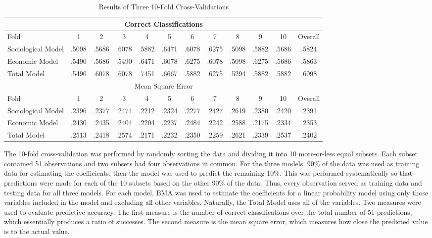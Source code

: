 \begin{table}
\begin{center}
\caption{Results of Three 10-Fold Cross-Validations}
\vspace{0.1cm}
\begin{tabular}{lccccccccccc}
  \hline
  \multicolumn{12}{c}{Correct Classifications} \\ \hline
 Fold & 1 & 2 & 3 & 4 & 5 & 6 & 7 & 8 & 9 & 10 & Overall \\ \hline
 Sociological Model & .5098 & .5686 & .6078 & .5882 & .6471 & .6078 & .6275 & .5098 & .5882 & .5686 & .5824 \\
 Economic Model & .5490 & .5686 & .5490 & .6471 & .6078 & .6275 & .6078 & .5098 & .6275 & .5686 & .5863 \\
 Total Model & .5490 & .6078 & .6078 & .7451 & .6667 & .5882 & .6275 & .5294 & .5882 & .5882 & .6098 \\ \hline
 \multicolumn{12}{c}{Mean Square Error} \\ \hline
 Fold & 1 & 2 & 3 & 4 & 5 & 6 & 7 & 8 & 9 & 10 & Overall \\ \hline
 Sociological Model & .2396 & .2377 & .2474 & .2212 & .2324 & .2277 & .2427 & .2619 & .2380 & .2420 & .2391 \\
 Economic Model & .2430 & .2435 & .2404 & .2204 & .2237 & .2484 & .2242 & .2588 & .2175 & .2334 & .2353 \\
 Total Model & .2513 & .2418 & .2574 & .2171 & .2232 & .2350 & .2259 & .2621 & .2339 & .2537 & .2402 \\
\hline
\end{tabular}
\end{center}
\end{table}

The 10-fold cross-validation was performed by randomly sorting the data and dividing it into 10 more-or-less equal subsets.  Each subset contained 51 observations and two subsets had four observations in common.  For the three models, 90\% of the data was used as training data for estimating the coefficients, then the model was used to predict the remaining 10\%.  This was performed systematically so that predictions were made for each of the 10 subsets based on the other 90\% of the data.  Thus, every observation served as training data and testing data for all three models.  For each model, BMA was used to estimate the coefficients for a linear probability model using only those variables included in the model and excluding all other variables.  Naturally, the Total Model uses all of the variables.  Two measures were used to evaluate predictive accuracy.  The first measure is the number of correct classifications over the total number of 51 predictions, which essentially produces a ratio of successes.  The second measure is the mean square error, which measures how close the predicted value is to the actual value.

